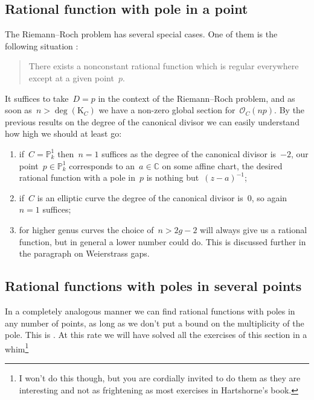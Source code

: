 \subsection{Rational function with pole in a point}
The Riemann--Roch problem has several special cases. One of them is the following situation \cite[exercise IV.1.1]{hartshorne-algebraic-geometry}:
\begin{quote}
  There exists a nonconstant rational function which is regular everywhere except at a given point~$p$.
\end{quote}
It suffices to take~$D=p$ in the context of the Riemann--Roch problem, and as soon as~$n>\deg(\mathrm{K}_C)$ we have a non-zero global section for~$\mathcal{O}_C(np)$. By the previous results on the degree of the canonical divisor we can easily understand how high we should at least go:
\begin{enumerate}
  \item if~$C=\mathbb{P}_k^1$ then~$n=1$ suffices as the degree of the canonical divisor is~$-2$, our point~$p\in\mathbb{P}_k^1$ corresponds to an~$a\in\mathbb{C}$ on some affine chart, the desired rational function with a pole in~$p$ is nothing but~$(z-a)^{-1}$;
  \item if~$C$ is an elliptic curve the degree of the canonical divisor is~$0$, so again~$n=1$ suffices;
  \item for higher genus curves the choice of~$n>2g-2$ will always give us a rational function, but in general a lower number could do. This is discussed further in the paragraph on Weierstrass gaps.
\end{enumerate}

\subsection{Rational functions with poles in several points}
In a completely analogous manner we can find rational functions with poles in any number of points, as long as we don't put a bound on the multiplicity of the pole. This is \cite[exercise IV.1.2]{hartshorne-algebraic-geometry}. At this rate we will have solved all the exercises of this section in a whim\footnote{I won't do this though, but you are cordially invited to do them as they are interesting and not as frightening as most exercises in Hartshorne's book.}

